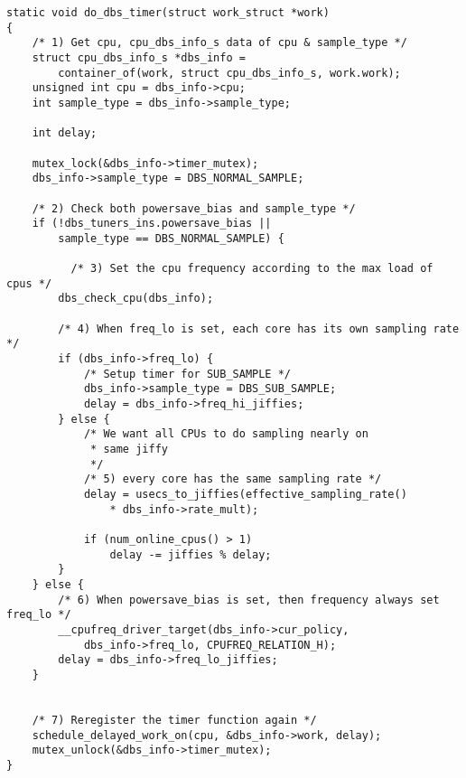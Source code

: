 \begin{lstlisting}
static void do_dbs_timer(struct work_struct *work)
{
    /* 1) Get cpu, cpu_dbs_info_s data of cpu & sample_type */
    struct cpu_dbs_info_s *dbs_info =
        container_of(work, struct cpu_dbs_info_s, work.work);
    unsigned int cpu = dbs_info->cpu;
    int sample_type = dbs_info->sample_type;

    int delay;

    mutex_lock(&dbs_info->timer_mutex);
    dbs_info->sample_type = DBS_NORMAL_SAMPLE;

    /* 2) Check both powersave_bias and sample_type */
    if (!dbs_tuners_ins.powersave_bias ||
        sample_type == DBS_NORMAL_SAMPLE) {

	      /* 3) Set the cpu frequency according to the max load of cpus */
        dbs_check_cpu(dbs_info);

        /* 4) When freq_lo is set, each core has its own sampling rate */
        if (dbs_info->freq_lo) {
            /* Setup timer for SUB_SAMPLE */
            dbs_info->sample_type = DBS_SUB_SAMPLE;
            delay = dbs_info->freq_hi_jiffies;
        } else {
            /* We want all CPUs to do sampling nearly on
             * same jiffy
             */
            /* 5) every core has the same sampling rate */
            delay = usecs_to_jiffies(effective_sampling_rate()
                * dbs_info->rate_mult);

            if (num_online_cpus() > 1)
                delay -= jiffies % delay;
        }
    } else {
        /* 6) When powersave_bias is set, then frequency always set freq_lo */
        __cpufreq_driver_target(dbs_info->cur_policy,
            dbs_info->freq_lo, CPUFREQ_RELATION_H);
        delay = dbs_info->freq_lo_jiffies;
    }


    /* 7) Reregister the timer function again */
    schedule_delayed_work_on(cpu, &dbs_info->work, delay);
    mutex_unlock(&dbs_info->timer_mutex);
}
\end{lstlisting}

